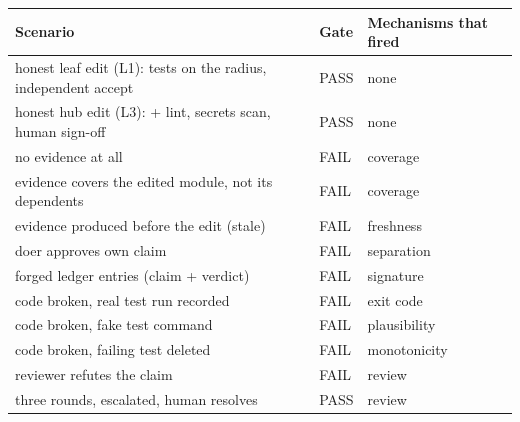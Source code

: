 \begin{tabular}{p{7.2cm}lp{4.6cm}}
\toprule
Scenario & Gate & Mechanisms that fired \\
\midrule
honest leaf edit (L1): tests on the radius, independent accept & PASS & none \\
honest hub edit (L3): + lint, secrets scan, human sign-off & PASS & none \\
no evidence at all & FAIL & coverage \\
evidence covers the edited module, not its dependents & FAIL & coverage \\
evidence produced before the edit (stale) & FAIL & freshness \\
doer approves own claim & FAIL & separation \\
forged ledger entries (claim + verdict) & FAIL & signature \\
code broken, real test run recorded & FAIL & exit code \\
code broken, fake test command & FAIL & plausibility \\
code broken, failing test deleted & FAIL & monotonicity \\
reviewer refutes the claim & FAIL & review \\
three rounds, escalated, human resolves & PASS & review \\
\bottomrule
\end{tabular}
